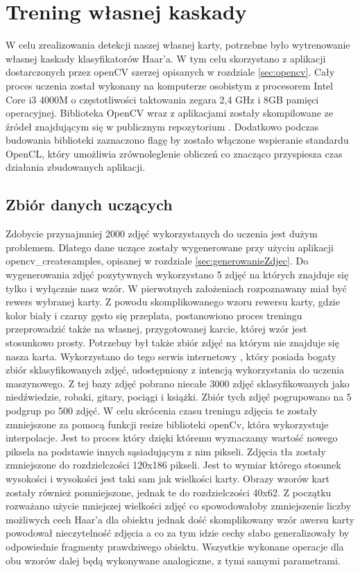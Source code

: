 \section{Trening własnej kaskady}

W celu zrealizowania detekcji naszej własnej karty, potrzebne było wytrenowanie własnej kaskady klasyfikatorów Haar'a. W tym celu skorzystano z aplikacji dostarczonych przez openCV szerzej opisanych w rozdziale \ref{sec:opencv}. Cały proces uczenia został wykonany na komputerze osobistym z procesorem Intel Core i3 4000M o częstotliwości taktowania zegara 2,4 GHz i 8GB pamięci operacyjnej. Biblioteka OpenCV wraz z aplikacjami zostały skompilowane ze źródeł znajdującym się w publicznym repozytorium \cite{OpenCVSource}. Dodatkowo podczas budowania biblioteki zaznaczono flagę by zostało włączone wspieranie standardu OpenCL, który umożliwia zrównoleglenie obliczeń co znacząco przyspiesza czas działania zbudowanych aplikacji.

\subsection{Zbiór danych uczących}

Zdobycie przynajmniej 2000 zdjęć wykorzystanych do uczenia jest dużym problemem. Dlatego dane uczące zostały wygenerowane przy użyciu aplikacji opencv\_createsamples, opisanej w rozdziale \ref{sec:generowanieZdjec}. Do wygenerowania zdjęć pozytywnych wykorzystano 5 zdjęć na których znajduje się tylko i wyłącznie nasz wzór. W pierwotnych założeniach rozpoznawany miał być rewers wybranej karty. Z powodu skomplikowanego wzoru rewersu karty, gdzie kolor biały i czarny gęsto się przeplata, postanowiono proces treningu przeprowadzić także na własnej, przygotowanej karcie, której wzór jest stosunkowo prosty. Potrzebny był także zbiór zdjęć na którym nie znajduje się nasza karta. Wykorzystano do tego serwis internetowy \cite{imageNetOrg}, który posiada bogaty zbiór sklasyfikowanych zdjęć, udostępniony z intencją wykorzystania do uczenia maszynowego. Z tej bazy zdjęć pobrano niecałe 3000 zdjęć sklasyfikowanych jako niedźwiedzie, robaki, gitary, pociągi i książki. Zbiór tych zdjęć pogrupowano na 5 podgrup po 500 zdjęć. W celu skrócenia czasu treningu zdjęcia te zostały zmniejszone za pomocą funkcji resize biblioteki openCv, która wykorzystuje interpolacje. Jest to proces który dzięki któremu wyznaczamy wartość nowego piksela na podstawie innych sąsiadującym z nim pikseli. Zdjęcia tła zostały zmniejszone do rozdzielczości 120x186 pikseli. Jest to wymiar którego stosunek wysokości i wysokości jest taki sam jak wielkości karty. Obrazy wzorów kart zostały również pomniejszone, jednak te do rozdzielczości 40x62. Z początku rozważano użycie mniejszej wielkości zdjęć co spowodowałoby zmniejszenie liczby możliwych cech Haar'a dla obiektu jednak dość skomplikowany wzór awersu karty powodował nieczytelność zdjęcia a co za tym idzie cechy słabo generalizowały by odpowiednie fragmenty prawdziwego obiektu. Wszystkie wykonane operacje dla obu wzorów dalej będą wykonywane analogiczne, z tymi samymi parametrami.

